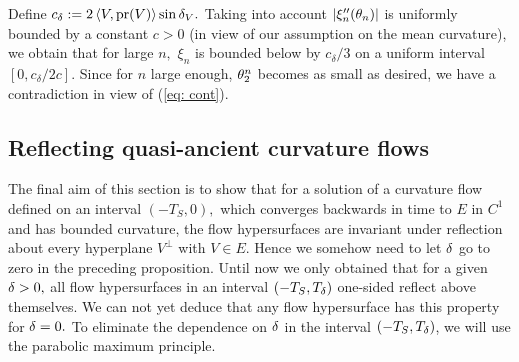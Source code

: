 \documentclass{amsart}
\begin{document}
{Define $c_{\delta}:=2\left\langle V,\operatorname{pr}(V) \right\rangle\sin\delta_V.$ Taking into account  $|\xi''_{n}(\theta_{n})|$ is uniformly bounded by a constant $c>0$ (in view of our assumption on the mean curvature), we obtain that for large $n,$ $\xi_n$ is bounded below by $c_{\delta}/3$ on a uniform interval $[0,c_{\delta}/2c]$. Since for $n$ large enough, $\theta_{2}^{n}$ becomes as small as desired, we have a contradiction in view of (\ref{eq: cont}).
}
\subsection{Reflecting quasi-ancient curvature flows}
The final aim of this section is to show that for a solution of a curvature flow defined on an interval $(-T_{S},0),$ which converges backwards in time to $E$ in $C^{1}$ and has bounded curvature, the flow hypersurfaces are invariant under reflection about every hyperplane $V^{\perp}$ with $V\in E.$ Hence we somehow need to let $\delta$ go to zero in the preceding proposition. Until now we only obtained that for a given $\delta>0,$ all flow hypersurfaces in an interval $(-T_{S},T_{\delta})$ one-sided reflect above themselves. We can not yet deduce that any flow hypersurface has this property for $\delta=0.$ To eliminate the dependence on $\delta$ in the interval $(-T_{S},T_{\delta})$, we will use the parabolic maximum principle.
\end{document}
